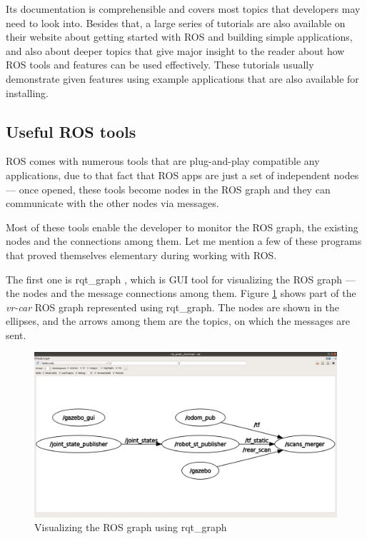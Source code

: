 Its documentation is comprehensible and covers most topics that developers may need to look into. Besides that, a large series of tutorials are also available on their website about getting started with ROS and building simple applications, and also about deeper topics that give major insight to the reader about how ROS tools and features can be used effectively. These tutorials usually demonstrate given features using example applications that are also available for installing.

\subsection{Useful ROS tools}
ROS comes with numerous tools that are plug-and-play compatible any applications, due to that fact that ROS apps are just a set of independent nodes --- once opened, these tools become nodes in the ROS graph and they can communicate with the other nodes via messages.

Most of these tools enable the developer to monitor the ROS graph, the existing nodes and the connections among them. Let me mention a few of these programs that proved themselves elementary during working with ROS.

The first one is rqt\_graph \cite{ros_rqt_graph}, which is GUI tool for visualizing the ROS graph --- the nodes and the message connections among them. Figure \ref{rqt_graph} shows part of the \textit{vr-car} ROS graph represented using rqt\_graph. The nodes are shown in the ellipses, and the arrows among them are the topics, on which the messages are sent.

\begin{figure}[!ht]
	\centering
	\includegraphics[width=\textwidth]{figures/raw/rqt_graph.png}
	\caption{Visualizing the ROS graph using rqt\_graph}
	\label{rqt_graph}
\end{figure}

